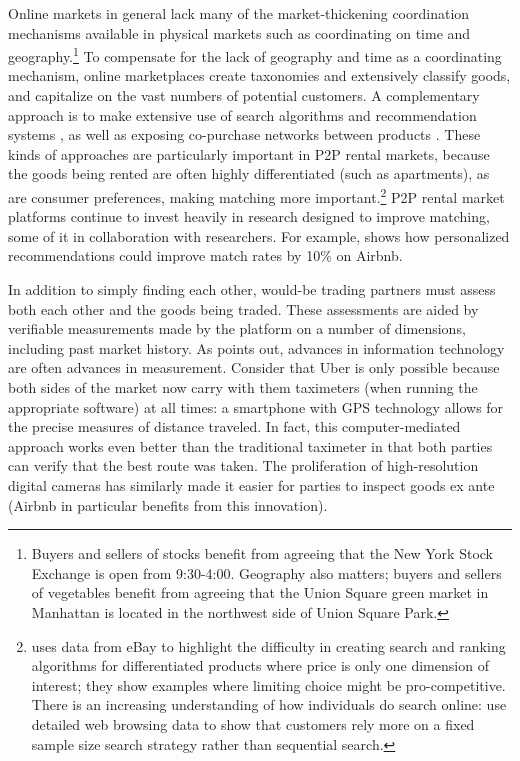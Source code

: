 \documentclass[12pt]{article}
\begin{document}
Online markets in general lack many of the market-thickening coordination mechanisms available in physical markets such as coordinating on time and geography.\footnote{
  Buyers and sellers of stocks benefit from agreeing that the New York Stock Exchange is open from 9:30-4:00.
  Geography also matters; buyers and sellers of vegetables benefit from agreeing that the Union Square green market in Manhattan is located in the northwest side of Union Square Park.
}
To compensate for the lack of geography and time as a coordinating mechanism, online marketplaces create taxonomies and extensively classify goods, and capitalize on the vast numbers of potential customers.
A complementary approach is to make extensive use of search algorithms and recommendation systems \citep{resnick1997recommender, adomavicius2005toward}, as well as exposing co-purchase networks between products \citep{oestreicher2012visible}.
These kinds of approaches are particularly important in P2P rental markets, because the goods being rented are often highly differentiated (such as apartments), as are consumer preferences, making matching more important.\footnote{
  \cite{dinerstein2014consumer} uses data from eBay to highlight the difficulty in creating search and ranking algorithms for differentiated products where price is only one dimension of interest; they show examples where limiting choice might be pro-competitive.
  There is an increasing understanding of how individuals do search online: 
  \cite{de2012testing} use detailed web browsing data to show that customers rely more on a fixed sample size search strategy rather than sequential search.  
}
P2P rental market platforms continue to invest heavily in research designed to improve matching, some of it in collaboration with researchers. 
For example, \cite{fradkin2013search} shows how personalized recommendations could improve match rates by 10\% on Airbnb. 

In addition to simply finding each other, would-be trading partners must assess both each other and the goods being traded. 
These assessments are aided by verifiable measurements made by the platform on a number of dimensions, including past market history. 
As \cite{varian2010computer} points out, advances in information technology are often advances in measurement.  
Consider that Uber is only possible because both sides of the market now carry with them taximeters (when running the appropriate software) at all times: 
a smartphone with GPS technology allows for the precise measures of distance traveled.
In fact, this computer-mediated approach works even better than the traditional taximeter in that both parties can verify that the best route was taken. 
The proliferation of high-resolution digital cameras has similarly made it easier for parties to inspect goods ex ante (Airbnb in particular benefits from this innovation).  
\end{document}
